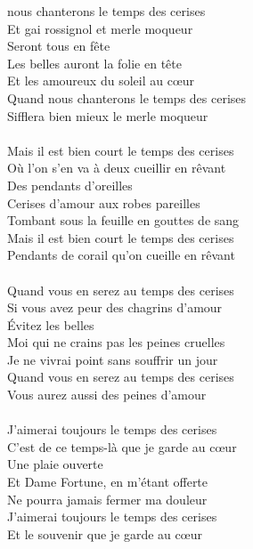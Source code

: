 
 nous chanterons le temps des cerises
\\Et gai rossignol et merle moqueur
\\Seront tous en fête
\\Les belles auront la folie en tête
\\Et les amoureux du soleil au cœur
\\Quand nous chanterons le temps des cerises
\\Sifflera bien mieux le merle moqueur
\\\\Mais il est bien court le temps des cerises
\\Où l'on s'en va à deux cueillir en rêvant
\\Des pendants d'oreilles
\\Cerises d'amour aux robes pareilles
\\Tombant sous la feuille en gouttes de sang
\\Mais il est bien court le temps des cerises
\\Pendants de corail qu'on cueille en rêvant
\\\\Quand vous en serez au temps des cerises
\\Si vous avez peur des chagrins d'amour
\\Évitez les belles
\\Moi qui ne crains pas les peines cruelles
\\Je ne vivrai point sans souffrir un jour
\\Quand vous en serez au temps des cerises
\\Vous aurez aussi des peines d'amour
\\\\J'aimerai toujours le temps des cerises
\\C'est de ce temps-là que je garde au cœur
\\Une plaie ouverte
\\Et Dame Fortune, en m'étant offerte
\\Ne pourra jamais fermer ma douleur
\\J'aimerai toujours le temps des cerises
\\Et le souvenir que je garde au cœur
\breakpage